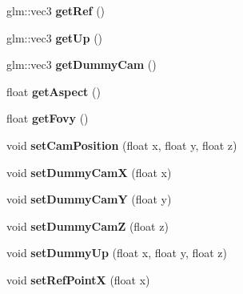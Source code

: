 \begin{DoxyCompactItemize}
\item 
\hypertarget{classarcball_cam_ae1eeae0e9f7fbd831be144676a8c24ab}{glm\-::vec3 {\bfseries get\-Ref} ()}\label{classarcball_cam_ae1eeae0e9f7fbd831be144676a8c24ab}

\item 
\hypertarget{classarcball_cam_a3e85cc5f19e416f242b75638021048de}{glm\-::vec3 {\bfseries get\-Up} ()}\label{classarcball_cam_a3e85cc5f19e416f242b75638021048de}

\item 
\hypertarget{classarcball_cam_a43a858a77781e0ddb3741c978c03f32a}{glm\-::vec3 {\bfseries get\-Dummy\-Cam} ()}\label{classarcball_cam_a43a858a77781e0ddb3741c978c03f32a}

\item 
\hypertarget{classarcball_cam_aac5a965215057e6e186803d943968870}{float {\bfseries get\-Aspect} ()}\label{classarcball_cam_aac5a965215057e6e186803d943968870}

\item 
\hypertarget{classarcball_cam_a735562d56733142ec6bea59f129c54e1}{float {\bfseries get\-Fovy} ()}\label{classarcball_cam_a735562d56733142ec6bea59f129c54e1}

\item 
\hypertarget{classarcball_cam_a4d7770c2cb98a18ec4ee71def3546a5b}{void {\bfseries set\-Cam\-Position} (float x, float y, float z)}\label{classarcball_cam_a4d7770c2cb98a18ec4ee71def3546a5b}

\item 
\hypertarget{classarcball_cam_ab9088e95818c1c3caa70977dc481ce50}{void {\bfseries set\-Dummy\-Cam\-X} (float x)}\label{classarcball_cam_ab9088e95818c1c3caa70977dc481ce50}

\item 
\hypertarget{classarcball_cam_a5f1828c382d650e131676a477e021592}{void {\bfseries set\-Dummy\-Cam\-Y} (float y)}\label{classarcball_cam_a5f1828c382d650e131676a477e021592}

\item 
\hypertarget{classarcball_cam_a9d447333fccec494bd56ec4f9225bdc5}{void {\bfseries set\-Dummy\-Cam\-Z} (float z)}\label{classarcball_cam_a9d447333fccec494bd56ec4f9225bdc5}

\item 
\hypertarget{classarcball_cam_a9a953205fcb8d47077d8a7eb9025f0cc}{void {\bfseries set\-Dummy\-Up} (float x, float y, float z)}\label{classarcball_cam_a9a953205fcb8d47077d8a7eb9025f0cc}

\item 
\hypertarget{classarcball_cam_ac98672875c1fbf0b7dfe4c98c9cc60c8}{void {\bfseries set\-Ref\-Point\-X} (float x)}\label{classarcball_cam_ac98672875c1fbf0b7dfe4c98c9cc60c8}


\end{DoxyCompactItemize}
